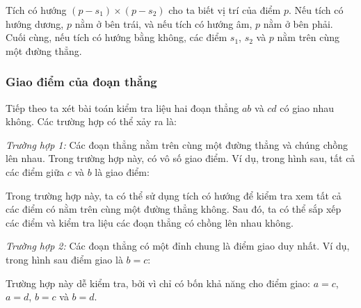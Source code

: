 Tích có hướng $(p-s_1) \times (p-s_2)$
cho ta biết vị trí của điểm $p$.
Nếu tích có hướng dương,
$p$ nằm ở bên trái,
và nếu tích có hướng âm,
$p$ nằm ở bên phải.
Cuối cùng, nếu tích có hướng bằng không,
các điểm $s_1$, $s_2$ và $p$ nằm trên cùng một đường thẳng.

\subsubsection{Giao điểm của đoạn thẳng}


Tiếp theo ta xét bài toán kiểm tra
liệu hai đoạn thẳng
$ab$ và $cd$ có giao nhau không. Các trường hợp có thể xảy ra là:

\textit{Trường hợp 1:}
Các đoạn thẳng nằm trên cùng một đường thẳng
và chúng chồng lên nhau.
Trong trường hợp này, có vô số
giao điểm.
Ví dụ, trong hình sau,
tất cả các điểm giữa $c$ và $b$ là
giao điểm:
\begin{center}
\end{center}

Trong trường hợp này, ta có thể sử dụng tích có hướng để
kiểm tra xem tất cả các điểm có nằm trên cùng một đường thẳng không.
Sau đó, ta có thể sắp xếp các điểm và kiểm tra
liệu các đoạn thẳng có chồng lên nhau không.

\textit{Trường hợp 2:}
Các đoạn thẳng có một đỉnh chung
là điểm giao duy nhất.
Ví dụ, trong hình sau
điểm giao là $b=c$:

\begin{center}
\end{center}

Trường hợp này dễ kiểm tra, bởi vì
chỉ có bốn khả năng
cho điểm giao:
$a=c$, $a=d$, $b=c$ và $b=d$.

